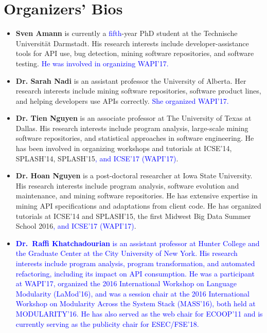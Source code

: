 \documentclass[10pt, conference]{IEEEtran}
\newcommand{\updated}[1]{{\textcolor{blue}{#1}}}
\begin{document}
\section{Organizers' Bios}
\begin{itemize}
\setlength\itemsep{5pt}
\item \textbf{Sven Amann} is currently a \updated{fifth}-year PhD student at the Technische Universit\"{a}t Darmstadt. His research interests include developer-assistance tools for API use, bug detection, mining software repositories, and software testing. \updated{He was involved in organizing WAPI'17.}

\item \textbf{Dr. Sarah Nadi} is an assistant professor the University of Alberta. Her research interests include mining software repositories, software product lines, and helping developers use APIs correctly. \updated{She organized WAPI'17.}

\item \textbf{Dr. Tien Nguyen} is an associate professor at The University of Texas at Dallas. His research interests include program analysis, large-scale mining software repositories, and statistical approaches in software engineering. He has been involved in organizing workshops and tutorials at ICSE’14, SPLASH’14, SPLASH’15\updated{, and ICSE'17 (WAPI'17)}.

\item \textbf{Dr. Hoan Nguyen} is a post-doctoral researcher at Iowa State University. His research interests include program analysis, software evolution and maintenance, and mining software repositories. He has extensive expertise in mining API specifications and adaptations from client code. He has organized tutorials at ICSE'14 and SPLASH'15, the first Midwest Big Data Summer School 2016\updated{, and ICSE'17 (WAPI'17)}.

\item \updated{\textbf{Dr.~Raffi Khatchadourian} is an assistant professor at Hunter College and the Graduate Center at the City University of New York. His research interests include program analysis, program transformation, and automated refactoring, including its impact on API consumption. He was a participant at WAPI'17, organized the 2016 International Workshop on Language Modularity (LaMod'16), and was a session chair at the 2016 International Workshop on Modularity Across the System Stack (MASS'16), both held at MODULARITY'16. He has also served as the web chair for ECOOP'11 and is currently serving as the publicity chair for ESEC/FSE'18.}
\end{itemize}
\end{document}
